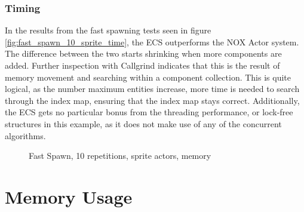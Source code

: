 \subsubsection{Timing}
In the results from the fast spawning tests seen in figure \ref{fig:fast_spawn_10_sprite_time},
the ECS outperforms the NOX Actor system.
The difference between the two starts shrinking when more components are added.
Further inspection with Callgrind indicates that this is the result of memory movement and searching within a component collection.
This is quite logical, as the number maximum entities increase, more time is needed
to search through the index map, ensuring that the index map stays correct.
Additionally, the ECS gets no particular bonus from the threading performance, or lock-free structures
in this example, as it does not make use of any of the concurrent algorithms.
\begin{figure}[H]
\centering
{}
\caption[Fast Spawning, ECS versus Actor, 10 repetitions, sprites, memory]{Fast Spawn, 10 repetitions, sprite actors, memory}
\label{fig:fast_spawn_10_sprite_peak_memory}
\end{figure}

\section{Memory Usage}
